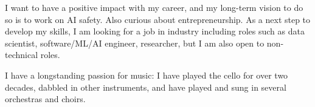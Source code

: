 I want to have a positive impact with my career, and my long-term vision to do so is to work on AI safety.
Also curious about entrepreneurship.
As a next step to develop my skills, I am looking for a job in industry
including roles such as data scientist, software/ML/AI engineer,
researcher, but I am also open to non-technical roles.


I have a longstanding passion for music:
I have played the cello for over two decades, dabbled in other instruments,
and have played and sung in several orchestras and choirs.

